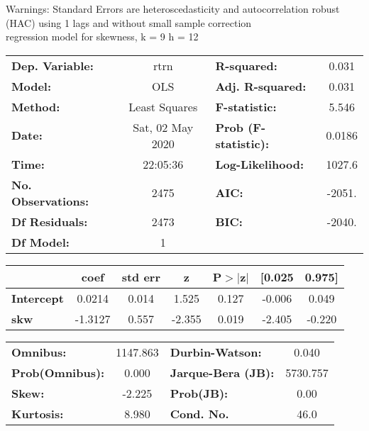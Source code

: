 Warnings: \newline
 [1] Standard Errors are heteroscedasticity and autocorrelation robust (HAC) using 1 lags and without small sample correction\\ 

regression model for skewness, k = 9 h = 12\begin{center}
\begin{tabular}{lclc}
\toprule
\textbf{Dep. Variable:}    &       rtrn       & \textbf{  R-squared:         } &     0.031   \\
\textbf{Model:}            &       OLS        & \textbf{  Adj. R-squared:    } &     0.031   \\
\textbf{Method:}           &  Least Squares   & \textbf{  F-statistic:       } &     5.546   \\
\textbf{Date:}             & Sat, 02 May 2020 & \textbf{  Prob (F-statistic):} &   0.0186    \\
\textbf{Time:}             &     22:05:36     & \textbf{  Log-Likelihood:    } &    1027.6   \\
\textbf{No. Observations:} &        2475      & \textbf{  AIC:               } &    -2051.   \\
\textbf{Df Residuals:}     &        2473      & \textbf{  BIC:               } &    -2040.   \\
\textbf{Df Model:}         &           1      & \textbf{                     } &             \\
\bottomrule
\end{tabular}
\begin{tabular}{lcccccc}
                   & \textbf{coef} & \textbf{std err} & \textbf{z} & \textbf{P$> |$z$|$} & \textbf{[0.025} & \textbf{0.975]}  \\
\midrule
\textbf{Intercept} &       0.0214  &        0.014     &     1.525  &         0.127        &       -0.006    &        0.049     \\
\textbf{skw}       &      -1.3127  &        0.557     &    -2.355  &         0.019        &       -2.405    &       -0.220     \\
\bottomrule
\end{tabular}
\begin{tabular}{lclc}
\textbf{Omnibus:}       & 1147.863 & \textbf{  Durbin-Watson:     } &    0.040  \\
\textbf{Prob(Omnibus):} &   0.000  & \textbf{  Jarque-Bera (JB):  } & 5730.757  \\
\textbf{Skew:}          &  -2.225  & \textbf{  Prob(JB):          } &     0.00  \\
\textbf{Kurtosis:}      &   8.980  & \textbf{  Cond. No.          } &     46.0  \\
\bottomrule
\end{tabular}
\end{center}

